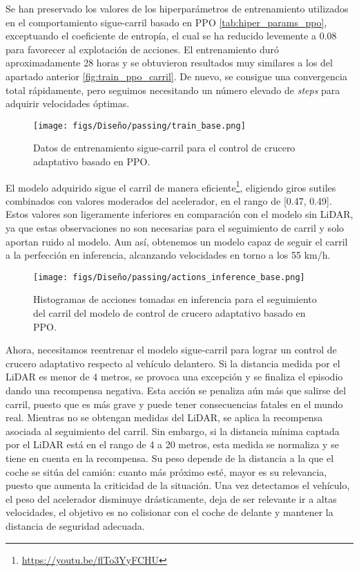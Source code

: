 \newpage

Se han preservado los valores de los hiperparámetros de entrenamiento utilizados en el comportamiento sigue-carril basado en \ac{PPO} \ref{tab:hiper_params_ppo}, exceptuando el coeficiente de entropía, el cual se ha reducido levemente a 0.08 para favorecer al explotación de acciones. El entrenamiento duró aproximadamente 28 horas y se obtuvieron resultados muy similares a los del apartado anterior \ref{fig:train_ppo_carril}. De nuevo, se consigue una convergencia total rápidamente, pero seguimos necesitando un número elevado de \textit{steps} para adquirir velocidades óptimas.

\begin{figure}[ht]
\centering
\texttt{[image: figs/Diseño/passing/train\_base.png]}
\caption{Datos de entrenamiento sigue-carril para el control de crucero adaptativo basado en \ac{PPO}.}
\label{fig:passing_train_base}
\end{figure}

El modelo adquirido sigue el carril de manera eficiente\footnote{\url{https://youtu.be/flTo3YyFCHU}}, eligiendo giros sutiles combinados con valores moderados del acelerador, en el rango de [0.47, 0.49]. Estos valores son ligeramente inferiores en comparación con el modelo sin \ac{LiDAR}, ya que estas observaciones no son necesarias para el seguimiento de carril y solo aportan ruido al modelo. Aun así, obtenemos un modelo capaz de seguir el carril a la perfección en inferencia, alcanzando velocidades en torno a los 55 km/h.
\begin{figure}[ht]
\centering
\texttt{[image: figs/Diseño/passing/actions\_inference\_base.png]}
\caption{Histogramas de acciones tomadas en inferencia para el seguimiento del carril del modelo de control de crucero adaptativo basado en \ac{PPO}.}
\label{fig:passing_actions_inf_base}
\end{figure}

\newpage

Ahora, necesitamos reentrenar el modelo sigue-carril para lograr un control de crucero adaptativo respecto al vehículo delantero. Si la distancia medida por el \ac{LiDAR} es menor de 4 metros, se provoca una excepción y se finaliza el episodio dando una recompensa negativa. Esta acción se penaliza aún más que salirse del carril, puesto que es más grave y puede tener consecuencias fatales en el mundo real. Mientras no se obtengan medidas del \ac{LiDAR}, se aplica la recompensa asociada al seguimiento del carril. Sin embargo, si la distancia mínima captada por el \ac{LiDAR} está en el rango de 4 a 20 metros, esta medida se normaliza y se tiene en cuenta en la recompensa. Su peso depende de la distancia a la que el coche se sitúa del camión: cuanto más próximo esté, mayor es su relevancia, puesto que aumenta la criticidad de la situación. Una vez detectamos el vehículo, el peso del acelerador disminuye drásticamente, deja de ser relevante ir a altas velocidades, el objetivo es no colisionar con el coche de delante y mantener la distancia de seguridad adecuada.

